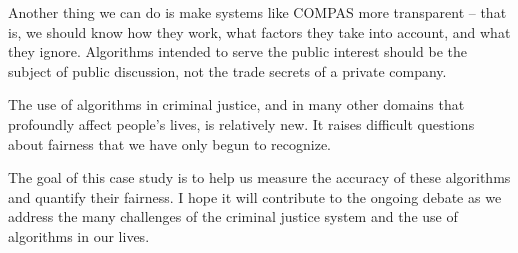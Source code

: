 Another thing we can do is make systems like COMPAS more transparent --
that is, we should know how they work, what factors they take into
account, and what they ignore. Algorithms intended to serve the public
interest should be the subject of public discussion, not the trade
secrets of a private company.

The use of algorithms in criminal justice, and in many other domains
that profoundly affect people's lives, is relatively new. It raises
difficult questions about fairness that we have only begun to recognize.

The goal of this case study is to help us measure the accuracy of these
algorithms and quantify their fairness. I hope it will contribute to the
ongoing debate as we address the many challenges of the criminal justice
system and the use of algorithms in our lives.
